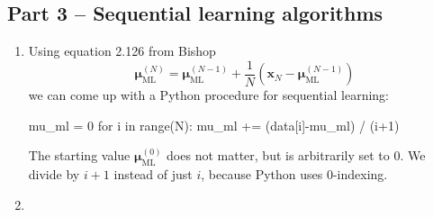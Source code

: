 \documentclass{article}
\begin{document}
\subsection*{Part 3 -- Sequential learning algorithms}
\begin{enumerate}
\item Using equation 2.126 from Bishop
$$
\bm{\mu}_\text{ML}^{(N)} = \bm{\mu}_\text{ML}^{(N-1)} + \frac{1}{N}(\bm{x}_N - \bm{\mu}_\text{ML}^{(N-1)})
$$
we can come up with a Python procedure for sequential learning:
\begin{python}
mu_ml = 0
for i in range(N):
    mu_ml += (data[i]-mu_ml) / (i+1)
\end{python}
The starting value $\bm{\mu}_\text{ML}^{(0)}$ does not matter, but is arbitrarily set to 0. We divide by $i + 1$ instead of just $i$, because Python uses 0-indexing.
\item 
\end{enumerate}
\end{document}
